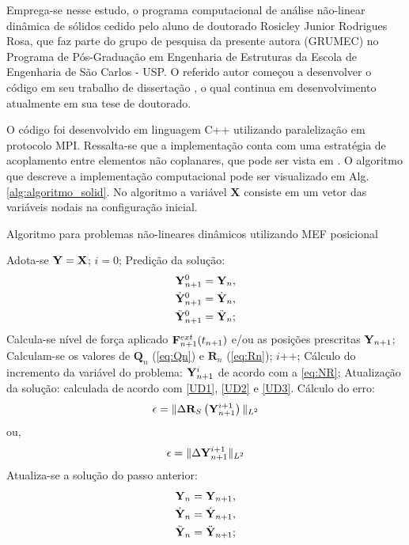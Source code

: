 Emprega-se nesse estudo, o programa computacional de análise não-linear dinâmica de sólidos cedido pelo aluno de doutorado Rosicley Junior Rodrigues Rosa, que faz parte do grupo de pesquisa da presente autora (GRUMEC) no Programa de Pós-Graduação em Engenharia de Estruturas da Escola de Engenharia de São Carlos - USP. O referido autor começou a desenvolver o código em seu trabalho de dissertação \cite{Rosa:2021}, o qual continua em desenvolvimento atualmente em sua tese de doutorado.

O código foi desenvolvido em linguagem C++ utilizando paralelização em protocolo MPI. Ressalta-se que a implementação conta com uma estratégia de acoplamento entre elementos não coplanares, que pode ser vista em . O algoritmo que descreve a implementação computacional pode ser visualizado em Alg. \ref{alg:algoritmo_solid}. No algoritmo a variável $\mathbf{X}$ consiste em um vetor das variáveis nodais na configuração inicial.

\begin{algorithm}
	\caption{Algoritmo para problemas não-lineares dinâmicos utilizando MEF posicional}
	\label{alg:algoritmo_solid}
	\begin{algorithmic}[1]
		\State Adota-se $\mathbf{Y} = \mathbf{X}$;
		\State $i=0$;
		\State Predição da solução: 
		\begin{align}
		\mathbf{Y}_{n+1}^{0} = \mathbf{Y}_{n},\\
		\dot{\mathbf{Y}}_{n+1}^{0} = \dot{\mathbf{Y}}_{n},\\
		\ddot{\mathbf{Y}}_{n+1}^{0} = \ddot{\mathbf{Y}}_{n};
		\end{align}
		\State Calcula-se  nível de força aplicado $\mathbf{F}^{ext}_{n+1}(t_{n+1})$ e/ou as posições prescritas $\mathbf{Y}_{n+1}$;
		\State Calculam-se os valores de $\mathbf{Q}_n$ (\autoref{eq:Qn}) e $\mathbf{R}_n$ (\autoref{eq:Rn});
		\State $i$++;
		\State Cálculo do incremento da variável do problema: $\mathbf{Y}_{n+1}^{i}$ de acordo com a \autoref{eq:NR};
		\State Atualização da solução: calculada de acordo com \autoref{UD1}, \autoref{UD2} e \autoref{UD3}.
		\State Cálculo do erro:
		\begin{align}
		\epsilon = \lVert \Delta\mathbf{R}_S\left(\mathbf{Y}_{n+1}^{i+1}\right) \lVert_{L^2} 
		\end{align}
		ou,
		\begin{align}
		\epsilon = \lVert\Delta\mathbf{Y}_{n+1}^{i+1}\lVert_{L^2} 
		\end{align}
		\EndWhile
		\State Atualiza-se a solução do passo anterior:
		\begin{align}
		\mathbf{Y}_{n} = \mathbf{Y}_{n+1},\\
		\dot{\mathbf{Y}}_{n} = \dot{\mathbf{Y}}_{n+1},\\
		\ddot{\mathbf{Y}}_{n} = \ddot{\mathbf{Y}}_{n+1};
		\end{align}
		\EndFor
	\end{algorithmic}
\end{algorithm}

